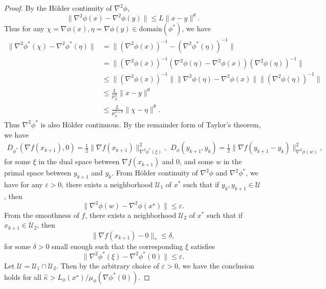 \documentclass{article}
\theoremstyle{plain}
\theoremstyle{definition}
\theoremstyle{remark}
\begin{document}
\begin{proof}
    By the H\"older continuity of $\nabla^2 \phi$, $$\|\nabla^2\phi(x)-\nabla^2\phi(y)\|\leq L\|x-y\|^\theta.$$
    Thus for any $\chi=\nabla\phi(x),\eta=\nabla \phi(y)\in \mathrm{domain}(\phi^*)$, we have
    $$\begin{aligned}
        \|\nabla^2 \phi^*(\chi)-\nabla^2 \phi^*(\eta)\|{}&=\|(\nabla^2 \phi(x))^{-1}-(\nabla^2 \phi^*(\eta))^{-1}\|\\
        {}&=\|(\nabla^2 \phi(x))^{-1}(\nabla^2 \phi(\eta)-\nabla^2 \phi(x))(\nabla^2 \phi(\eta))^{-1}\|\\
        {}&\leq \|(\nabla^2 \phi(x))^{-1}\| \|\nabla^2 \phi(\eta)-\nabla^2 \phi(x)\| \|(\nabla^2 \phi(\eta))^{-1}\|\\
        {}&\leq \frac{L}{\mu_\phi^2}\|x-y\|^\theta\\
        {}&\leq \frac{L}{\mu_\phi^{2+\theta}}\|\chi-\eta\|^\theta.
        \end{aligned}$$
    Thus $\nabla^2 \phi^*$ is also H\"older continuous. By the remainder form of Taylor's theorem, we have
    $$\begin{aligned}
        D_{\phi^*}(\nabla f(x_{k+1}),0){}=\frac{1}{2}\|\nabla f(x_{k+1})\|_{\nabla^2 \phi^*(\xi)}^2,~~ D_{\phi}(y_{k+1},y_k){}=\frac{1}{2}\|\nabla f(y_{k+1}-y_k)\|_{\nabla^2 \phi(w)}^2,
    \end{aligned}$$
    for some $\xi$ in the dual space between $\nabla f(x_{k+1})$ and $0$, and some $w$ in the primal space between $y_{k+1}$ and $y_k$. From H\"older continuity of $\nabla^2 \phi$ and $\nabla^2 \phi^*$, we have for any $\varepsilon>0$, there exists a neighborhood $\mathcal{U}_1$ of $x^*$ such that if $y_k,y_{k+1}\in \mathcal{U}$, then $$\|\nabla^2 \phi(w)-\nabla^2 \phi(x^\star)\|\leq \varepsilon.$$ From the smoothness of $f$, there exists a neighborhood $\mathcal{U}_2$ of $x^*$ such that if $x_{k+1}\in \mathcal{U}_2$, then $$\|\nabla f(x_{k+1})-0\|_*\leq \delta,$$ for some $\delta>0$ small enough such that the corresponding $\xi$ satisfies $$\|\nabla^2 \phi^*(\xi)-\nabla^2 \phi^*(0)\|\leq \varepsilon.$$
    Let $\mathcal{U}=\mathcal{U}_1\cap \mathcal{U}_2$. Then by the arbitrary choice of $\varepsilon>0$, we have the conclusion holds for all $\hat{\kappa}>L_{\phi}(x^\star)/\mu_{\phi}(\nabla \phi^*(0))$.
\end{proof}
\end{document}
